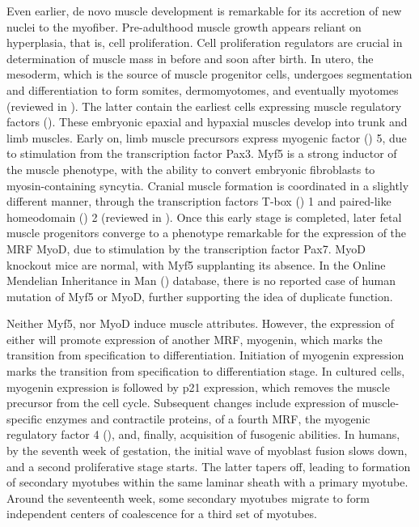 \documentclass[12pt,english]{report}\usepackage[]{graphicx}\usepackage[]{color}
\begin{document}
Even earlier, de novo muscle development is remarkable for its accretion
of new nuclei to the myofiber. Pre-adulthood muscle growth appears
reliant on hyperplasia, that is, cell proliferation. Cell proliferation
regulators are crucial in determination of muscle mass in before and
soon after birth. In utero, the mesoderm, which is the source of muscle
progenitor cells, undergoes segmentation and differentiation to form
somites, dermomyotomes, and eventually myotomes (reviewed in \citep{yusuf2012myogenesis}).
The latter contain the earliest cells expressing muscle regulatory
factors (). These embryonic
epaxial and hypaxial muscles develop into trunk and limb muscles.
Early on, limb muscle precursors express myogenic factor ()
5, due to stimulation from the transcription factor Pax3\citep{daston1996pax-3,francetic2011skeletal}.
Myf5 is a strong inductor of the muscle phenotype, with the ability
to convert embryonic fibroblasts to myosin-containing syncytia\citep{braun1989novel}.
Cranial muscle formation is coordinated in a slightly different manner,
through the transcription factors T-box ()
1 and paired-like homeodomain ()
2 (reviewed in \citep{noden2005relations}). Once this early stage
is completed, later fetal muscle progenitors converge to a phenotype
remarkable for the expression of the MRF MyoD, due to stimulation
by the transcription factor Pax7\citep{tajbakhsh1997redefining}.
MyoD knockout mice are normal, with Myf5 supplanting its absence\citep{rudnicki1993myod}.
In the Online Mendelian Inheritance in Man ()
database, there is no reported case of human mutation of Myf5 or MyoD,
further supporting the idea of duplicate function.

Neither Myf5, nor MyoD induce muscle attributes. However, the expression
of either will promote expression of another MRF, myogenin, which
marks the transition from specification to differentiation. Initiation
of myogenin expression marks the transition from specification to
differentiation stage. In cultured cells, myogenin expression is followed
by p21 expression, which removes the muscle precursor from the cell
cycle\citep{andres1996myogenin}. Subsequent changes include expression
of muscle-specific enzymes and contractile proteins\citep{bergstrom2001molecular},
of a fourth MRF, the myogenic regulatory factor 4 ()\citep{hasty1993muscle},
and, finally, acquisition of fusogenic abilities. In humans, by the
seventh week of gestation, the initial wave of myoblast fusion slows
down, and a second proliferative stage starts. The latter tapers off,
leading to formation of secondary myotubes within the same laminar
sheath with a primary myotube. Around the seventeenth week, some secondary
myotubes migrate to form independent centers of coalescence for a
third set of myotubes\citep{draeger1987primary}.
\end{document}
